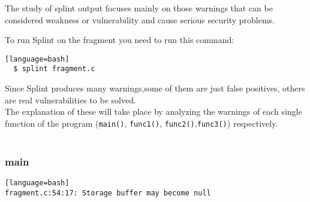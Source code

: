 \documentclass[a4paper,12pt]{article}
\newenvironment{SpecialPar}
  {\begin{shaded}}
  {\end{shaded}}
\begin{document}
\begin{SpecialPar}
\noindent
The study of splint output focuses mainly on those warnings that can be considered weakness or vulnerability and cause serious security problems.
\end{SpecialPar}
\noindent
To run Splint on the fragment you need to run this command:
\begin{lstlisting}[style=DOS][language=bash]
  $ splint fragment.c
\end{lstlisting}
Since Splint produces many warnings,some of them are just false positives, others are real vulnerabilities to be solved.\\
The explanation of these will take place by analyzing the warnings of each single function of the program (\texttt{main()}, \texttt{func1()}, \texttt{func2()},\texttt{func3()}) respectively.\\
\\
\noindent
\subsubsection{main}

\begin{lstlisting}[style=DOS][language=bash]
fragment.c:54:17: Storage buffer may become null
\end{lstlisting}
\end{document}
